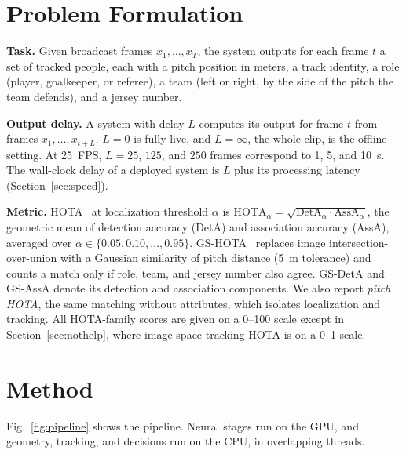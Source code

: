 \documentclass[conference]{IEEEtran}
\begin{document}
\section{Problem Formulation}
\textbf{Task.} Given broadcast frames $x_1,\dots,x_T$, the system outputs for each frame $t$ a set of tracked people, each with a pitch position in meters, a track identity, a role (player, goalkeeper, or referee), a team (left or right, by the side of the pitch the team defends), and a jersey number.

\textbf{Output delay.} A system with delay $L$ computes its output for frame $t$ from frames $x_1,\dots,x_{t+L}$. $L=0$ is fully live, and $L=\infty$, the whole clip, is the offline setting. At 25~FPS, $L=25$, $125$, and $250$ frames correspond to 1, 5, and 10~s. The wall-clock delay of a deployed system is $L$ plus its processing latency (Section~\ref{sec:speed}).

\textbf{Metric.} HOTA~\cite{luiten2021hota} at localization threshold $\alpha$ is $\mathrm{HOTA}_\alpha=\sqrt{\mathrm{DetA}_\alpha\cdot\mathrm{AssA}_\alpha}$, the geometric mean of detection accuracy (DetA) and association accuracy (AssA), averaged over $\alpha\in\{0.05,0.10,\dots,0.95\}$. GS-HOTA~\cite{somers2024gsr} replaces image intersection-over-union with a Gaussian similarity of pitch distance (5~m tolerance) and counts a match only if role, team, and jersey number also agree. GS-DetA and GS-AssA denote its detection and association components. We also report \emph{pitch HOTA}, the same matching without attributes, which isolates localization and tracking. All HOTA-family scores are given on a 0--100 scale except in Section~\ref{sec:nothelp}, where image-space tracking HOTA is on a 0--1 scale.

\section{Method}
Fig.~\ref{fig:pipeline} shows the pipeline. Neural stages run on the GPU, and geometry, tracking, and decisions run on the CPU, in overlapping threads.
\end{document}
